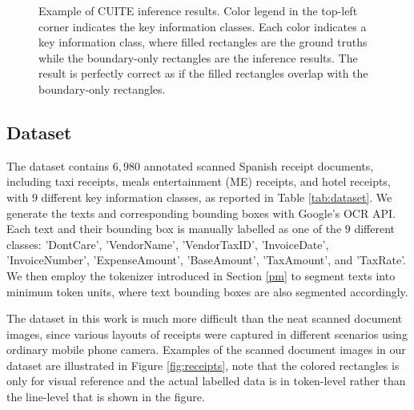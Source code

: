 \documentclass[10pt,twocolumn,letterpaper]{article}
\begin{document}
\begin{figure}
\begin{center}
\end{center}
   \caption{Example of CUITE inference results. Color legend in the top-left corner indicates the key information classes. Each color indicates a key information class, where filled rectangles are the ground truths while the boundary-only rectangles are the inference results. The result is perfectly correct as if the filled rectangles overlap with the boundary-only rectangles.}
\label{fig:result}
\end{figure}

\subsection{Dataset}
The dataset contains $6,980$ annotated scanned Spanish receipt documents, including taxi receipts, meals entertainment (ME) receipts, and hotel receipts, with $9$ different key information classes, as reported in Table \ref{tab:dataset}. We generate the texts and corresponding bounding boxes with Google's OCR API. Each text and their bounding box is manually labelled as one of the $9$ different classes: 'DontCare', 'VendorName', 'VendorTaxID', 'InvoiceDate', 'InvoiceNumber', 'ExpenseAmount', 'BaseAmount', 'TaxAmount', and 'TaxRate'. We then employ the tokenizer introduced in Section \ref{pm} to segment texts into minimum token units, where text bounding boxes are also segmented accordingly. 

The dataset in this work is much more difficult than the neat scanned document images, since various layouts of receipts were captured in different scenarios using ordinary mobile phone camera. Examples of the scanned document images in our dataset are illustrated in Figure \ref{fig:receipts}, note that the colored rectangles is only for visual reference and the actual labelled data is in token-level rather than the line-level that is shown in the figure.
\end{document}
